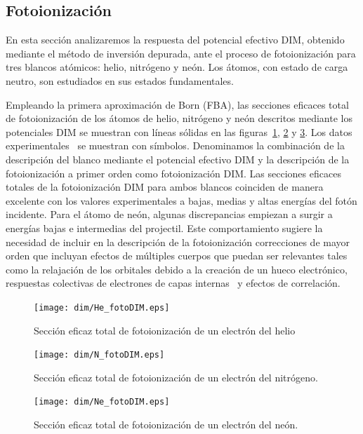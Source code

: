 \newpage
\subsection{Fotoionización}
\label{subsec:foto}

En esta sección analizaremos la respuesta del potencial efectivo DIM, 
obtenido mediante el método de inversión depurada, ante el proceso de
fotoionización para tres blancos atómicos: helio, nitrógeno y neón. 
Los átomos, con estado de carga neutro, son estudiados en sus estados
fundamentales.

Empleando la primera aproximación de Born (FBA), las secciones eficaces
total de fotoionización de los átomos de helio, nitrógeno y neón descritos 
mediante los potenciales DIM se muestran con líneas sólidas en las 
figuras~\ref{fig:HephotoDIM}, \ref{fig:NphotoDIM} y \ref{fig:NephotoDIM}.
Los datos experimentales~\cite{Henke1993,Samson1990,Samson2002,Stolte2016} 
se muestran con símbolos. Denominamos la combinación de la 
descripción del blanco mediante el potencial efectivo DIM y la descripción 
de la fotoionización a primer orden como fotoionización DIM. 
Las secciones eficaces totales de la fotoionización DIM para ambos 
blancos coinciden de manera excelente con los valores experimentales
a bajas, medias y altas energías del fotón incidente. Para el átomo de
neón, algunas discrepancias empiezan a surgir a energías bajas e 
intermedias del projectil. Este comportamiento sugiere la necesidad de 
incluir en la descripción de la fotoionización correcciones de mayor 
orden que incluyan efectos de múltiples cuerpos que puedan ser 
relevantes tales como la relajación de los orbitales debido a la 
creación de un hueco electrónico, respuestas colectivas de electrones 
de capas internas~\cite{Ederer1964} y efectos de correlación.

\begin{figure}[H]
\centering
 \texttt{[image: dim/He\_fotoDIM.eps]}
\caption[Fotoionización de helio.]
{Sección eficaz total de fotoionización de un electrón del helio}
\label{fig:HephotoDIM}
\end{figure}
\begin{figure}[H]
\centering
 \texttt{[image: dim/N\_fotoDIM.eps]}
\caption[Fotoionización de nitrógeno.]
{Sección eficaz total de fotoionización de un electrón del 
nitrógeno.}
\label{fig:NphotoDIM}
\end{figure}
\begin{figure}[H]
\centering
 \texttt{[image: dim/Ne\_fotoDIM.eps]}
\caption[Fotoionización de neón.]
{Sección eficaz total de fotoionización de un electrón del neón.}
\label{fig:NephotoDIM}
\end{figure}


